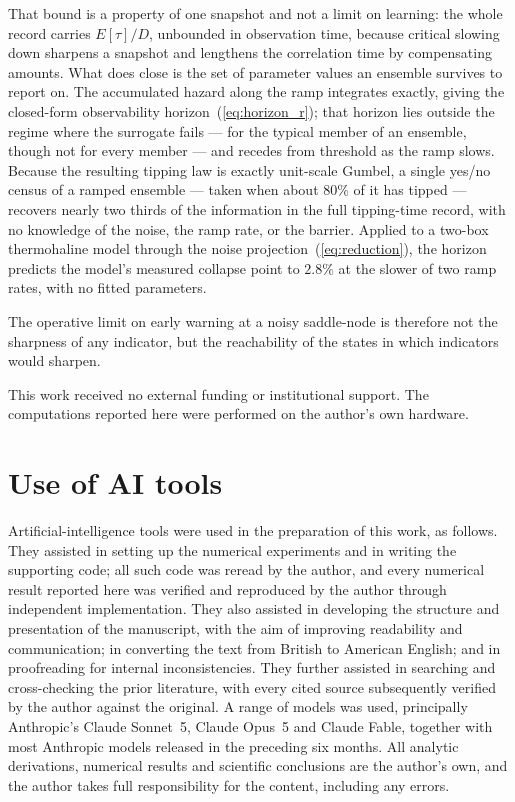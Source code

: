 \documentclass[%
 twocolumn,
 superscriptaddress,
 amsmath,amssymb,
 aps,
 pre,
 floatfix,
]{revtex4-2}
\begin{document}
That bound is a property of one snapshot and not a limit on learning: the whole record carries $E[\tau]/D$, unbounded in observation time, because critical slowing down sharpens a snapshot and lengthens the correlation time by compensating amounts.  What does close is the set of parameter values an ensemble survives to report on.  The accumulated hazard along the ramp integrates exactly, giving the closed-form observability horizon~(\ref{eq:horizon_r}); that horizon lies outside the regime where the surrogate fails --- for the typical member of an ensemble, though not for every member --- and recedes from threshold as the ramp slows.  Because the resulting tipping law is exactly unit-scale Gumbel, a single yes/no census of a ramped ensemble --- taken when about $80\%$ of it has tipped --- recovers nearly two thirds of the information in the full tipping-time record, with no knowledge of the noise, the ramp rate, or the barrier.  Applied to a two-box thermohaline model through the noise projection~(\ref{eq:reduction}), the horizon predicts the model's measured collapse point to $2.8\%$ at the slower of two ramp rates, with no fitted parameters.

The operative limit on early warning at a noisy saddle-node is therefore not the sharpness of any indicator, but the reachability of the states in which indicators would sharpen.

\begin{acknowledgments}
This work received no external funding or institutional support.  The
computations reported here were performed on the author's own hardware.
\end{acknowledgments}

\section*{Use of AI tools}
Artificial-intelligence tools were used in the preparation of this work, as
follows.  They assisted in setting up the numerical experiments and in writing
the supporting code; all such code was reread by the author, and every numerical
result reported here was verified and reproduced by the author through
independent implementation.  They also assisted in developing the structure and
presentation of the manuscript, with the aim of improving readability and
communication; in converting the text from British to American English; and in
proofreading for internal inconsistencies.  They further assisted in searching
and cross-checking the prior literature, with every cited source subsequently
verified by the author against the original.  A range of models was used,
principally Anthropic's Claude Sonnet~5, Claude Opus~5 and Claude Fable,
together with most Anthropic models released in the preceding six months.  All
analytic derivations, numerical results and scientific conclusions are the
author's own, and the author takes full responsibility for the content,
including any errors.
\end{document}
